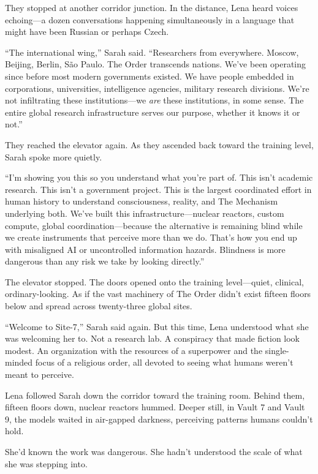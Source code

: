 They stopped at another corridor junction. In the distance, Lena heard voices echoing—a dozen conversations happening simultaneously in a language that might have been Russian or perhaps Czech.

``The international wing,'' Sarah said. ``Researchers from everywhere. Moscow, Beijing, Berlin, São Paulo. The Order transcends nations. We've been operating since before most modern governments existed. We have people embedded in corporations, universities, intelligence agencies, military research divisions. We're not infiltrating these institutions—we \textit{are} these institutions, in some sense. The entire global research infrastructure serves our purpose, whether it knows it or not.''

They reached the elevator again. As they ascended back toward the training level, Sarah spoke more quietly.

``I'm showing you this so you understand what you're part of. This isn't academic research. This isn't a government project. This is the largest coordinated effort in human history to understand consciousness, reality, and The Mechanism underlying both. We've built this infrastructure—nuclear reactors, custom compute, global coordination—because the alternative is remaining blind while we create instruments that perceive more than we do. That's how you end up with misaligned AI or uncontrolled information hazards. Blindness is more dangerous than any risk we take by looking directly.''

The elevator stopped. The doors opened onto the training level—quiet, clinical, ordinary-looking. As if the vast machinery of The Order didn't exist fifteen floors below and spread across twenty-three global sites.

``Welcome to Site-7,'' Sarah said again. But this time, Lena understood what she was welcoming her to. Not a research lab. A conspiracy that made fiction look modest. An organization with the resources of a superpower and the single-minded focus of a religious order, all devoted to seeing what humans weren't meant to perceive.

Lena followed Sarah down the corridor toward the training room. Behind them, fifteen floors down, nuclear reactors hummed. Deeper still, in Vault 7 and Vault 9, the models waited in air-gapped darkness, perceiving patterns humans couldn't hold.

She'd known the work was dangerous. She hadn't understood the scale of what she was stepping into.

